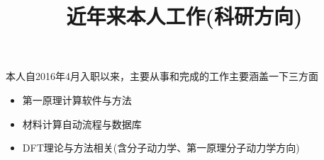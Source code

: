 
\title{近年来本人工作(科研方向)}
\author[ ]{}   %
\renewcommand*{\Authfont}{\small\rm} %
\renewcommand*{\Affilfont}{\small\it} %
\renewcommand\Authands{ and } %
\renewcommand\Authands{ , } %
\date{} %


\maketitle
本人自2016年4月入职以来，主要从事和完成的工作主要涵盖一下三方面
\begin{itemize}
	\item 第一原理计算软件与方法
	\item 材料计算自动流程与数据库
	\item \textrm{DFT}理论与方法相关(含分子动力学、第一原理分子动力学方向)
\end{itemize}

